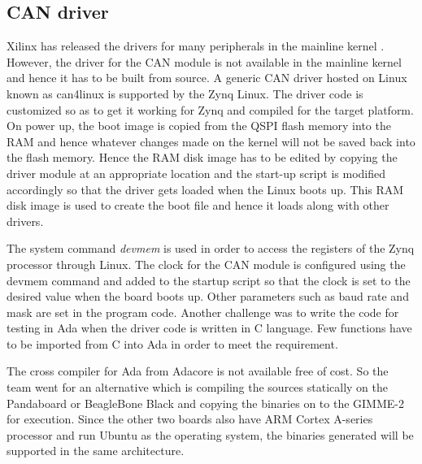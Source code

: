 \subsection{CAN driver}
Xilinx has released the drivers for many peripherals in the mainline kernel \cite{web:XilDrivers}. However, the driver for the CAN module is not available in the mainline kernel and hence it has to be built from source. A generic CAN driver hosted on Linux known as can4linux \cite{web:can4linux} is supported by the Zynq Linux. The driver code is customized so as to get it working for Zynq and compiled for the target platform. On power up, the boot image is copied from the QSPI flash memory into the RAM and hence whatever changes made on the kernel will not be saved back into the flash memory. Hence the RAM disk image has to be edited by copying the driver module at an appropriate location and the start-up script is modified accordingly so that the driver gets loaded when the Linux boots up. This RAM disk image is used to create the boot file and hence it loads along with other drivers. 

The system command \textit{devmem} is used in order to access the registers of the Zynq processor through Linux. The clock for the CAN module is configured using the devmem command and added to the startup script so that the clock is set to the desired value when the board boots up. Other parameters such as baud rate and mask are set in the program code. Another challenge was to write the code for testing in Ada when the driver code is written in C language. Few functions have to be imported from C into Ada in order to meet the requirement.

The cross compiler for Ada from Adacore is not available free of cost. So the team went for an alternative which is compiling the sources statically on the Pandaboard \cite{panda} or BeagleBone Black and copying the binaries on to the GIMME-2 for execution. Since the other two boards also have ARM Cortex A-series processor and run Ubuntu as the operating system, the binaries generated will be supported in the same architecture. 
